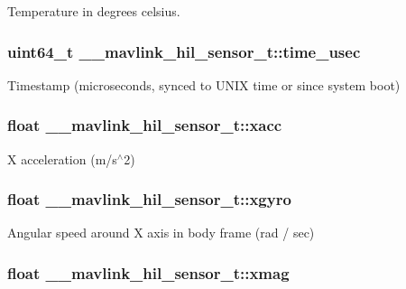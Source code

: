 Temperature in degrees celsius. 

\hypertarget{struct____mavlink__hil__sensor__t_a45de41520af13fd33f21c82c72a98b75}{
\subsubsection[{time\+\_\+usec}]{\setlength{\rightskip}{0pt plus 5cm}uint64\+\_\+t \+\_\+\+\_\+mavlink\+\_\+hil\+\_\+sensor\+\_\+t\+::time\+\_\+usec}}\label{struct____mavlink__hil__sensor__t_a45de41520af13fd33f21c82c72a98b75}


Timestamp (microseconds, synced to U\+N\+I\+X time or since system boot) 

\hypertarget{struct____mavlink__hil__sensor__t_a20c3e6c7f8dd61b698cb617ec76c4b9d}{
\subsubsection[{xacc}]{\setlength{\rightskip}{0pt plus 5cm}float \+\_\+\+\_\+mavlink\+\_\+hil\+\_\+sensor\+\_\+t\+::xacc}}\label{struct____mavlink__hil__sensor__t_a20c3e6c7f8dd61b698cb617ec76c4b9d}


X acceleration (m/s$^\wedge$2) 

\hypertarget{struct____mavlink__hil__sensor__t_a3b4035c288cba98923051942dfd85dc0}{
\subsubsection[{xgyro}]{\setlength{\rightskip}{0pt plus 5cm}float \+\_\+\+\_\+mavlink\+\_\+hil\+\_\+sensor\+\_\+t\+::xgyro}}\label{struct____mavlink__hil__sensor__t_a3b4035c288cba98923051942dfd85dc0}


Angular speed around X axis in body frame (rad / sec) 

\hypertarget{struct____mavlink__hil__sensor__t_a246f9f9b48771987750d94e15a0465f3}{
\subsubsection[{xmag}]{\setlength{\rightskip}{0pt plus 5cm}float \+\_\+\+\_\+mavlink\+\_\+hil\+\_\+sensor\+\_\+t\+::xmag}}\label{struct____mavlink__hil__sensor__t_a246f9f9b48771987750d94e15a0465f3}


